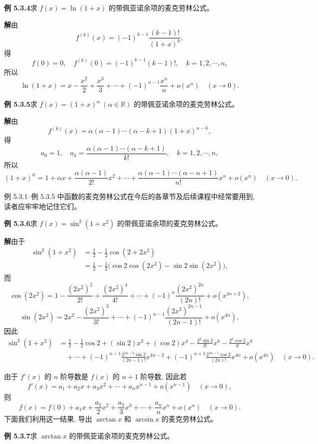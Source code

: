 \documentclass[UTF8, 12pt, fontset=fandol, oneside]{ctexart}
\begin{document}
\noindent\textbf{例 5.3.4}\quad 求 $f(x)=\ln(1+x)$ 的带佩亚诺余项的麦克劳林公式。

\noindent\textbf{解}\quad 由
\[
  f^{(k)}(x)=(-1)^{k-1}\frac{(k-1)!}{(1+x)^k},
\]
得
\[
  f(0)=0,\quad f^{(k)}(0)=(-1)^{k-1}(k-1)!,\quad k=1,2,\cdots,n,
\]
所以
\[
  \ln(1+x)=x-\frac{x^2}{2}+\frac{x^3}{3}+\cdots+(-1)^{n-1}\frac{x^n}{n}+o(x^n)\quad (x\to0).
\]

\noindent\textbf{例 5.3.5}\quad 求 $f(x)=(1+x)^\alpha\ (\alpha\in\mathbb{R})$ 的带佩亚诺余项的麦克劳林公式。

\noindent\textbf{解}\quad 由
\[
  f^{(k)}(x)=\alpha(\alpha-1)\cdots(\alpha-k+1)(1+x)^{\alpha-k},
\]
得
\[
  a_0=1,\quad
  a_k=\frac{\alpha(\alpha-1)\cdots(\alpha-k+1)}{k!},\quad k=1,2,\cdots,n,
\]
所以
\[
  (1+x)^\alpha
  =
  1+\alpha x+\frac{\alpha(\alpha-1)}{2!}x^2+\cdots
  +\frac{\alpha(\alpha-1)\cdots(\alpha-n+1)}{n!}x^n+o(x^n)
  \quad (x\to0).
\]

例 5.3.1--例 5.3.5 中函数的麦克劳林公式在今后的各章节及后续课程中经常要用到, 读者应牢牢地记住它们。

\noindent\textbf{例 5.3.6}\quad 求 $f(x)=\sin^2(1+x^2)$ 的带佩亚诺余项的麦克劳林公式。

\noindent\textbf{解}\quad 由于
\[
\begin{aligned}
  \sin^2(1+x^2)
  &=
  \frac12-\frac12\cos(2+2x^2) \\
  &=
  \frac12-\frac12\bigl(\cos2\cos(2x^2)-\sin2\sin(2x^2)\bigr),
\end{aligned}
\]
而
\[
  \cos(2x^2)=1-\frac{(2x^2)^2}{2!}+\frac{(2x^2)^4}{4!}+\cdots+(-1)^n\frac{(2x^2)^{2n}}{(2n)!}+o(x^{4n+2}),
\]
\[
  \sin(2x^2)=2x^2-\frac{(2x^2)^3}{3!}+\cdots+(-1)^{n-1}\frac{(2x^2)^{2n-1}}{(2n-1)!}+o(x^{4n}),
\]
因此
\[
\begin{aligned}
  \sin^2(1+x^2)
  &=
  \frac12-\frac12\cos2+(\sin2)x^2+(\cos2)x^4-\frac{2^2\sin2}{3!}x^6
  -\frac{2^3\cos2}{4!}x^8 \\
  &\quad+\cdots+(-1)^{n-1}\frac{2^{2n-2}\sin2}{(2n-1)!}x^{4n-2}
  +(-1)^{n+1}\frac{2^{2n-1}\cos2}{(2n)!}x^{4n}
  +o(x^{4n})
  \quad (x\to0).
\end{aligned}
\]

由于 $f'(x)$ 的 $n$ 阶导数是 $f(x)$ 的 $n+1$ 阶导数, 因此若
\[
  f'(x)=a_1+a_2x+a_3x^2+\cdots+a_nx^{n-1}+o(x^{n-1})\quad (x\to0),
\]
则
\[
  f(x)=f(0)+a_1x+\frac{a_2}{2}x^2+\frac{a_3}{3}x^3+\cdots+\frac{a_n}{n}x^n+o(x^n)\quad (x\to0).
\]
下面我们利用这一结果, 导出 $\arctan x$ 和 $\arcsin x$ 的麦克劳林公式。

\noindent\textbf{例 5.3.7}\quad 求 $\arctan x$ 的带佩亚诺余项的麦克劳林公式。
\end{document}
